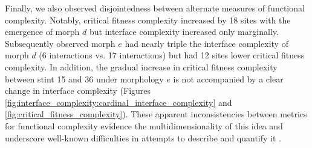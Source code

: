 Finally, we also observed disjointedness between alternate measures of functional complexity.
Notably, critical fitness complexity increased by 18 sites with the emergence of morph $d$ but interface complexity increased only marginally.
Subsequently observed morph $e$ had nearly triple the interface complexity of morph $d$ (6 interactions vs. 17 interactions) but had 12 sites lower critical fitness complexity.
In addition, the gradual increase in critical fitness complexity between stint 15 and 36 under morphology $e$ is not accompanied by a clear change in interface complexity (Figures \ref{fig:interface_complexity:cardinal_interface_complexity} and \ref{fig:critical_fitness_complexity}).
These apparent inconsistencies between metrics for functional complexity evidence the multidimensionality of this idea and underscore well-known difficulties in attempts to describe and quantify it \citep{bottcher2018molecules}.
